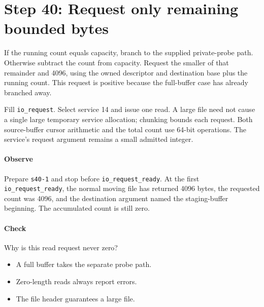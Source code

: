 \section{Step 40: Request only remaining bounded bytes}
If the running count equals capacity, branch to the supplied private-probe
path. Otherwise subtract the count from capacity. Request the smaller of that
remainder and 4096, using the owned descriptor and destination base plus the
running count. This request is positive because the full-buffer case has already
branched away.

Fill \texttt{io\_request}. Select service 14 and issue one read. A large file
need not cause a single large temporary service allocation; chunking bounds each
request. Both source-buffer cursor arithmetic and the total count use 64-bit
operations. The service's request argument remains a small admitted integer.

\paragraph{Observe} Prepare \texttt{s40-1} and stop before
\texttt{io\_request\_ready}. At the first \texttt{io\_request\_ready}, the normal moving
file has returned 4096 bytes, the requested count was 4096, and the destination
argument named the staging-buffer beginning. The accumulated count is still zero.

\paragraph{Check} Why is this read request never zero?
\begin{itemize}
  \item[A.] A full buffer takes the separate probe path.
  \item[B.] Zero-length reads always report errors.
  \item[C.] The file header guarantees a large file.
\end{itemize}
